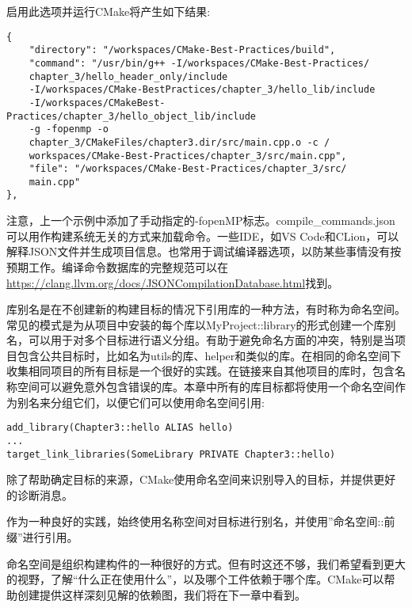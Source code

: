 启用此选项并运行CMake将产生如下结果:

\begin{lstlisting}[style=styleCMake]
{
	"directory": "/workspaces/CMake-Best-Practices/build",
	"command": "/usr/bin/g++ -I/workspaces/CMake-Best-Practices/
	chapter_3/hello_header_only/include
    -I/workspaces/CMake-BestPractices/chapter_3/hello_lib/include
    -I/workspaces/CMakeBest-Practices/chapter_3/hello_object_lib/include
    -g -fopenmp -o
	chapter_3/CMakeFiles/chapter3.dir/src/main.cpp.o -c /
	workspaces/CMake-Best-Practices/chapter_3/src/main.cpp",
	"file": "/workspaces/CMake-Best-Practices/chapter_3/src/
	main.cpp"
},
\end{lstlisting}

注意，上一个示例中添加了手动指定的-fopenMP标志。compile\_commands.json可以用作构建系统无关的方式来加载命令。一些IDE，如VS Code和CLion，可以解释JSON文件并生成项目信息。也常用于调试编译器选项，以防某些事情没有按预期工作。编译命令数据库的完整规范可以在\url{https://clang.llvm.org/docs/JSONCompilationDatabase.html}找到。


库别名是在不创建新的构建目标的情况下引用库的一种方法，有时称为命名空间。常见的模式是为从项目中安装的每个库以MyProject::library的形式创建一个库别名，可以用于对多个目标进行语义分组。有助于避免命名方面的冲突，特别是当项目包含公共目标时，比如名为utils的库、helper和类似的库。在相同的命名空间下收集相同项目的所有目标是一个很好的实践。在链接来自其他项目的库时，包含名称空间可以避免意外包含错误的库。本章中所有的库目标都将使用一个命名空间作为别名来分组它们，以便它们可以使用命名空间引用:

\begin{lstlisting}[style=styleCMake]
add_library(Chapter3::hello ALIAS hello)
...
target_link_libraries(SomeLibrary PRIVATE Chapter3::hello)
\end{lstlisting}

除了帮助确定目标的来源，CMake使用命名空间来识别导入的目标，并提供更好的诊断消息。

\begin{tcolorbox}[colback=blue!5!white,colframe=blue!75!black,title=使用命名空间]
作为一种良好的实践，始终使用名称空间对目标进行别名，并使用”命名空间::前缀”进行引用。
\end{tcolorbox}

命名空间是组织构建构件的一种很好的方式。但有时这还不够，我们希望看到更大的视野，了解“什么正在使用什么”，以及哪个工件依赖于哪个库。CMake可以帮助创建提供这样深刻见解的依赖图，我们将在下一章中看到。














